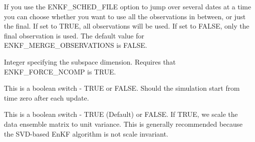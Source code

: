 \documentclass[letterpaper,10pt,english]{sphinxmanual}
\begin{document}
\label{\detokenize{keywords/index:enkf-merge-observations}}
\begin{sphinxShadowBox}

If you use the ENKF\_SCHED\_FILE option to jump over several dates at a time you
can choose whether you want to use all the observations in between, or just
the final. If set to TRUE, all observations will be used. If set to FALSE,
only the final observation is used. The default value for
ENKF\_MERGE\_OBSERVATIONS is FALSE.


%
\begin{sphinxVerbatim}[commandchars=\\\{\}]
  
 
\end{sphinxVerbatim}
\end{sphinxShadowBox}
\label{\detokenize{keywords/index:enkf-ncomp}}
\begin{sphinxShadowBox}

Integer specifying the subspace dimension. Requires that ENKF\_FORCE\_NCOMP is
TRUE.
\end{sphinxShadowBox}
\label{\detokenize{keywords/index:enkf-rerun}}
\begin{sphinxShadowBox}

This is a boolean switch - TRUE or FALSE. Should the simulation start from
time zero after each update.
\end{sphinxShadowBox}
\label{\detokenize{keywords/index:enkf-scaling}}
\begin{sphinxShadowBox}

This is a boolean switch - TRUE (Default) or FALSE. If TRUE, we scale the data
ensemble matrix to unit variance. This is generally recommended because the
SVD-based EnKF algorithm is not scale invariant.
\end{sphinxShadowBox}
\label{\detokenize{keywords/index:enkf-truncation}}
\end{document}

